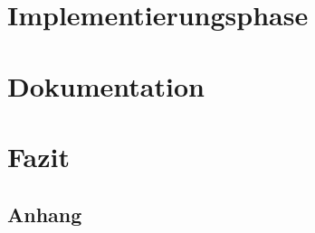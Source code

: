 \documentclass[12pt, a4paper]{article}
\begin{document}
\section{Implementierungsphase}
\newpage
\section{Dokumentation}
\newpage
\section{Fazit}

\newpage
\begin{alphasection}
\section{Anhang}
\end{alphasection}

%
%
\end{document}
